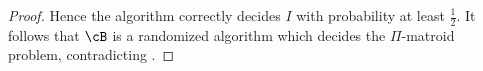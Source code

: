 \begin{proof}
	Hence %
	the algorithm  correctly decides $I$ with probability at least $\frac{1}{2}$. %
	It follows that $\cB$ is %
	a randomized algorithm which decides the $\Pi$-matroid problem, contradicting . 
\end{proof}



